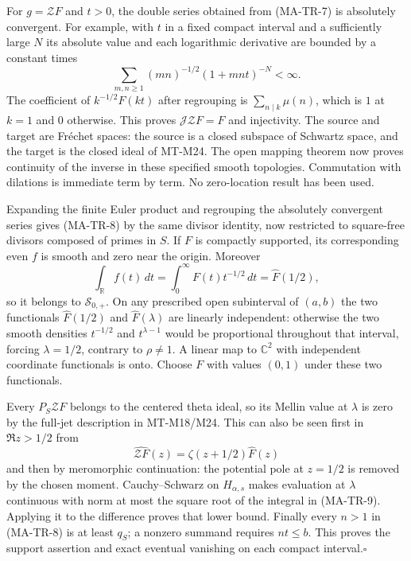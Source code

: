 For $g=\mathcal ZF$ and $t>0$, the double series obtained from
(MA-TR-7) is absolutely convergent. For example, with $t$ in a fixed
compact interval and a sufficiently large $N$ its absolute value
and each logarithmic derivative are bounded by a constant times
\[
 \sum_{m,n\ge1}(mn)^{-1/2}(1+mnt)^{-N}<\infty.
\]
The coefficient of $k^{-1/2}F(kt)$ after regrouping is
$\sum_{n\mid k}\mu(n)$, which is $1$ at $k=1$ and $0$ otherwise.
This proves $\mathcal J\mathcal ZF=F$ and injectivity. The source
and target are Fr\'echet spaces: the source is a closed subspace
of Schwartz space, and the target is the closed ideal of MT-M24.
The open mapping theorem now proves continuity of the inverse in
these specified smooth topologies. Commutation with dilations is
immediate term by term. No zero-location result has been used.

Expanding the finite Euler product and regrouping the absolutely
convergent series gives (MA-TR-8) by the same divisor identity,
now restricted to square-free divisors composed of primes in $S$.
If $F$ is compactly supported, its corresponding even $f$ is
smooth and zero near the origin. Moreover
\[
 \int_{\mathbb R}f(t)\,dt
    =\int_0^\infty F(t)t^{-1/2}\,dt=\widehat F(1/2),
\]
so it belongs to $\mathscr S_{0,+}$. On any prescribed open
subinterval of $(a,b)$ the two functionals
$\widehat F(1/2)$ and $\widehat F(\lambda)$ are linearly independent:
otherwise the two smooth densities $t^{-1/2}$ and $t^{\lambda-1}$
would be proportional throughout that interval, forcing
$\lambda=1/2$, contrary to $\rho\ne1$. A linear map to
$\mathbb C^2$ with independent coordinate functionals is onto.
Choose $F$ with values $(0,1)$ under these two functionals.

Every $P_S\mathcal ZF$ belongs to the centered theta ideal, so its
Mellin value at $\lambda$ is zero by the full-jet description in
MT-M18/M24. This can also be seen first in $\Re z>1/2$ from
\[
 \widehat{\mathcal ZF}(z)=\zeta(z+1/2)\widehat F(z)
\]
and then by meromorphic continuation: the potential pole at $z=1/2$
is removed by the chosen moment. Cauchy--Schwarz on
$H_{\alpha,s}$ makes evaluation at $\lambda$ continuous with norm
at most the square root of the integral in (MA-TR-9). Applying it
to the difference proves that lower bound. Finally every $n>1$
in (MA-TR-8) is at least $q_S$; a nonzero summand requires $nt\le b$.
This proves the support assertion and exact eventual vanishing on
each compact interval.\hfill$\square$

